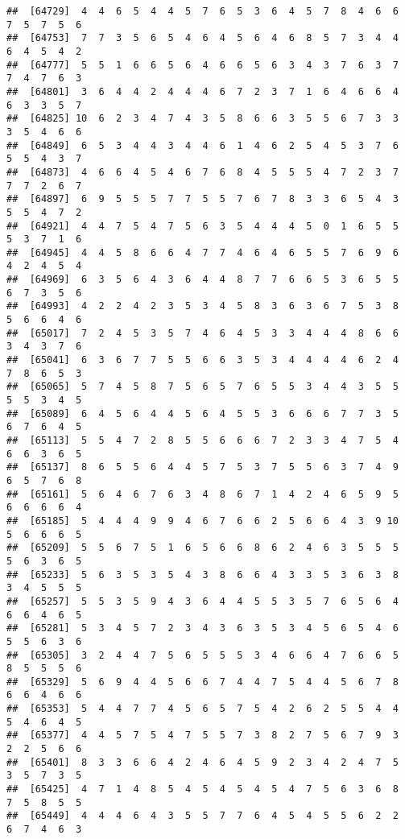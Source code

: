\documentclass[
]{book}
\begin{document}
\begin{verbatim}
##  [64729]  4  4  6  5  4  4  5  7  6  5  3  6  4  5  7  8  4  6  6  7  5  7  5  6
##  [64753]  7  7  3  5  6  5  4  6  4  5  6  4  6  8  5  7  3  4  4  6  4  5  4  2
##  [64777]  5  5  1  6  6  5  6  4  6  6  5  6  3  4  3  7  6  3  7  7  4  7  6  3
##  [64801]  3  6  4  4  2  4  4  4  6  7  2  3  7  1  6  4  6  6  4  6  3  3  5  7
##  [64825] 10  6  2  3  4  7  4  3  5  8  6  6  3  5  5  6  7  3  3  3  5  4  6  6
##  [64849]  6  5  3  4  4  3  4  4  6  1  4  6  2  5  4  5  3  7  6  5  5  4  3  7
##  [64873]  4  6  6  4  5  4  6  7  6  8  4  5  5  5  4  7  2  3  7  7  7  2  6  7
##  [64897]  6  9  5  5  5  7  7  5  5  7  6  7  8  3  3  6  5  4  3  5  5  4  7  2
##  [64921]  4  4  7  5  4  7  5  6  3  5  4  4  4  5  0  1  6  5  5  5  3  7  1  6
##  [64945]  4  4  5  8  6  6  4  7  7  4  6  4  6  5  5  7  6  9  6  4  2  4  5  4
##  [64969]  6  3  5  6  4  3  6  4  4  8  7  7  6  6  5  3  6  5  5  6  7  3  5  6
##  [64993]  4  2  2  4  2  3  5  3  4  5  8  3  6  3  6  7  5  3  8  5  6  6  4  6
##  [65017]  7  2  4  5  3  5  7  4  6  4  5  3  3  4  4  4  8  6  6  3  4  3  7  6
##  [65041]  6  3  6  7  7  5  5  6  6  3  5  3  4  4  4  4  6  2  4  7  8  6  5  3
##  [65065]  5  7  4  5  8  7  5  6  5  7  6  5  5  3  4  4  3  5  5  5  5  3  4  5
##  [65089]  6  4  5  6  4  4  5  6  4  5  5  3  6  6  6  7  7  3  5  6  7  6  4  5
##  [65113]  5  5  4  7  2  8  5  5  6  6  6  7  2  3  3  4  7  5  4  6  6  3  6  5
##  [65137]  8  6  5  5  6  4  4  5  7  5  3  7  5  5  6  3  7  4  9  6  5  7  6  8
##  [65161]  5  6  4  6  7  6  3  4  8  6  7  1  4  2  4  6  5  9  5  6  6  6  6  4
##  [65185]  5  4  4  4  9  9  4  6  7  6  6  2  5  6  6  4  3  9 10  5  6  6  6  5
##  [65209]  5  5  6  7  5  1  6  5  6  6  8  6  2  4  6  3  5  5  5  5  6  3  6  5
##  [65233]  5  6  3  5  3  5  4  3  8  6  6  4  3  3  5  3  6  3  8  3  4  5  5  5
##  [65257]  5  5  3  5  9  4  3  6  4  4  5  5  3  5  7  6  5  6  4  6  6  4  6  5
##  [65281]  5  3  4  5  7  2  3  4  3  6  3  5  3  4  5  6  5  4  6  5  5  6  3  6
##  [65305]  3  2  4  4  7  5  6  5  5  5  3  4  6  6  4  7  6  6  5  8  5  5  5  6
##  [65329]  5  6  9  4  4  5  6  6  7  4  4  7  5  4  4  5  6  7  8  6  6  4  6  6
##  [65353]  5  4  4  7  7  4  5  6  5  7  5  4  2  6  2  5  5  4  4  5  4  6  4  5
##  [65377]  4  4  5  7  5  4  7  5  5  7  3  8  2  7  5  6  7  9  3  2  2  5  6  6
##  [65401]  8  3  3  6  6  4  2  4  6  4  5  9  2  3  4  2  4  7  5  3  5  7  3  5
##  [65425]  4  7  1  4  8  5  4  5  4  5  4  5  4  7  5  6  3  6  8  7  5  8  5  5
##  [65449]  4  4  4  6  4  3  5  5  7  7  6  4  5  4  5  5  6  2  2  6  7  4  6  3

\end{verbatim}
\end{document}
